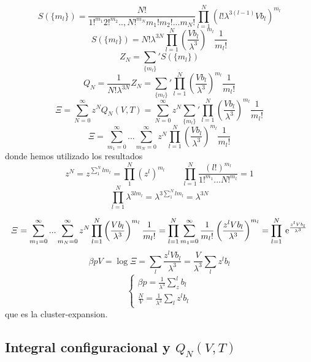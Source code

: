 \documentclass[10pt,oneside]{CBFT_book}
\begin{document}
\[
	S(\{ m_l \}) = \frac{N!}{ 1!^{m_1} 2!^{m_2} ..,N!^{m_N} m_1! m_2! ... m_N!} \prod_{l=1}^N
	( l! \lambda^{3(l-1)}Vb_l )^{m_l} 
\]
\[
	S(\{ m_l \}) = N! \lambda^{3N} \prod_{l=1}^N \left( \frac{Vb_l}{\lambda^3}\right)^{m_l}\frac{1}{m_l!}
\]
\[
	Z_N = \sum_ {\{ m_l \}}' S(\{ m_l \})
\]
\[
	Q_N = \frac{1}{N! \lambda^{3N}} Z_N = \sum_ {\{ m_l \}}' \prod_{l=1}^N 
	\left( 	\frac{Vb_l}{\lambda^3}\right)^{m_l}\frac{1}{m_l!}
\]
\[
	\Xi = \sum_{N=0}^\infty z^N Q_N(V,T) = \sum_{N=0}^\infty z^N \sum_ {\{ m_l \}}' \prod_{l=1}^N 
	\left( 	\frac{Vb_l}{\lambda^3}\right)^{m_l}\frac{1}{m_l!}
\]
\[
	\Xi = \sum_ {m_1=0}^\infty ... \sum_ {m_N=0}^\infty   z^N \prod_{l=1}^N 
	\left( 	\frac{Vb_l}{\lambda^3}\right)^{m_l}\frac{1}{m_l!}
\]
donde hemos utilizado los resultados
\[
	z^N = z^{\sum_1^N l m_l } = \prod_1^N (z^l)^{m_l} \qquad 
	\prod_{l=1}^N \frac{(l!)^{m_l}}{1!^{m_1}...N!^{m_l}} = 1
\]
\[
	\prod_{l=1}^N  \lambda^{3lm_l} = \lambda^{3\sum_1^N lm_l} = \lambda^{3N}
\]

\[
	\Xi = \sum_ {m_1=0}^\infty ... \sum_ {m_N=0}^\infty   z^N \prod_{l=1}^N 
	\left( 	\frac{Vb_l}{\lambda^3}\right)^{m_l}\frac{1}{m_l!} = 
	\prod_{l=1}^N  \sum_ {m_1=0}^\infty \frac{1}{m_l!} \left( \frac{z^l Vb_l}{\lambda^3}\right)^{m_l} =
	\prod_{l=1}^N  \:\mathrm{e}^{ \frac{z^l Vb_l}{\lambda^3} } 
\]
\[
	\beta pV = \log \Xi = \sum_l \frac{z^l V b_l}{\lambda^3} = \frac{V}{\lambda^3} \sum_l z^l b_l
\]
\[
	\begin{cases}
	\beta p = \frac{1}{\lambda^3} \sum_z^l b_l \\
	\frac{N}{V} = \frac{1}{\lambda^3} \sum_l z^l b_l
	\end{cases}
\]
que es la cluster-expansion.

\subsection{Integral configuracional y $Q_N(V,T)$}
\end{document}
